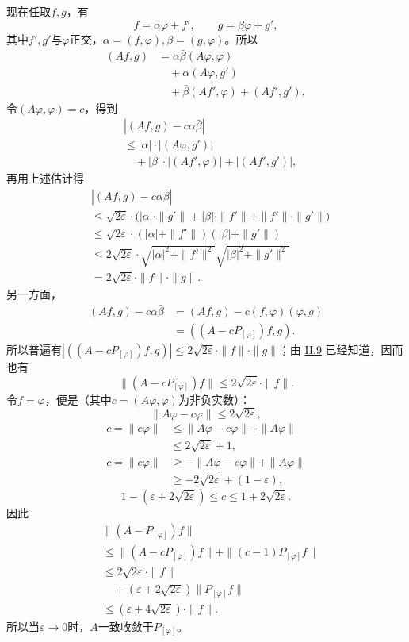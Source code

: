 \documentclass[fontsize=13pt,twoside,openany,headings=normal,parskip=false,bookmarkpackage=false,DIV=calc]{scrbook}
\begin{document}
现在任取$f,\allowbreak g$，有
\[
f=\alpha\varphi+f',\qquad g=\beta\varphi+g',
\]
其中$f',\allowbreak g'$与$\varphi$正交，$\alpha=(f,\allowbreak \varphi),\allowbreak \beta=(g,\allowbreak \varphi)$。所以
\begin{align*}
(Af,g)&=\alpha\bar\beta(A\varphi,\varphi)\\
&\quad+\alpha(A\varphi,g')\\
&\quad+\bar\beta(Af',\varphi)+(Af',g'),
\end{align*}
令$(A\varphi,\allowbreak \varphi)=c$，得到
\begin{align*}
&|(Af,g)-c\alpha\bar\beta|\\
&\leq|\alpha|\cdot|(A\varphi,g')|\\
&\quad+|\beta|\cdot|(Af',\varphi)|+|(Af',g')|,
\end{align*}
再用上述估计得
\begin{align*}
&|(Af,g)-c\alpha\bar\beta|\\
&\leq\sqrt{2\varepsilon}\cdot
\bigl(|\alpha|\cdot\|g'\|+|\beta|\cdot\|f'\|+\|f'\|\cdot\|g'\|\bigr)\\
&\leq\sqrt{2\varepsilon}\cdot(|\alpha|+\|f'\|)(|\beta|+\|g'\|)\\
&\leq2\sqrt{2\varepsilon}\cdot
\sqrt{|\alpha|^2+\|f'\|^2}\sqrt{|\beta|^2+\|g'\|^2}\\
&=2\sqrt{2\varepsilon}\cdot\|f\|\cdot\|g\|.
\end{align*}
另一方面，
\begin{align*}
(Af,g)-c\alpha\bar\beta
&=(Af,g)-c(f,\varphi)(\varphi,g)\\
&=((A-cP_{[\varphi]})f,g).
\end{align*}
所以普遍有$|((A-cP_{[\varphi]})f,\allowbreak g)|\leq2\sqrt{2\varepsilon}\cdot\|f\|\cdot\|g\|$；由 \hyperref[sec:II.9]{II.9} 已经知道，因而也有\hypertarget{origpage-100}{}\label{origpage-100}\[
\|(A-cP_{[\varphi]})f\|\leq2\sqrt{2\varepsilon}\cdot\|f\|.
\]
令$f=\varphi$，便是（其中$c=(A\varphi,\allowbreak \varphi)$为非负实数）：
\[
\|A\varphi-c\varphi\|\leq2\sqrt{2\varepsilon},
\]
\begin{align*}
c=\|c\varphi\|&\leq\|A\varphi-c\varphi\|+\|A\varphi\|\\
&\leq2\sqrt{2\varepsilon}+1,\\
c=\|c\varphi\|&\geq-\|A\varphi-c\varphi\|+\|A\varphi\|\\
&\geq-2\sqrt{2\varepsilon}+(1-\varepsilon),
\end{align*}
\[
1-(\varepsilon+2\sqrt{2\varepsilon})\leq c\leq1+2\sqrt{2\varepsilon}.
\]
因此
\begin{align*}
&\|(A-P_{[\varphi]})f\|\\
&\leq\|(A-cP_{[\varphi]})f\|+\|(c-1)P_{[\varphi]}f\|\\
&\leq2\sqrt{2\varepsilon}\cdot\|f\|\\
&\quad+(\varepsilon+2\sqrt{2\varepsilon})\|P_{[\varphi]}f\|\\
&\leq(\varepsilon+4\sqrt{2\varepsilon})\cdot\|f\|.
\end{align*}
所以当$\varepsilon\to0$时，$A$一致收敛于$P_{[\varphi]}$。
\end{document}
